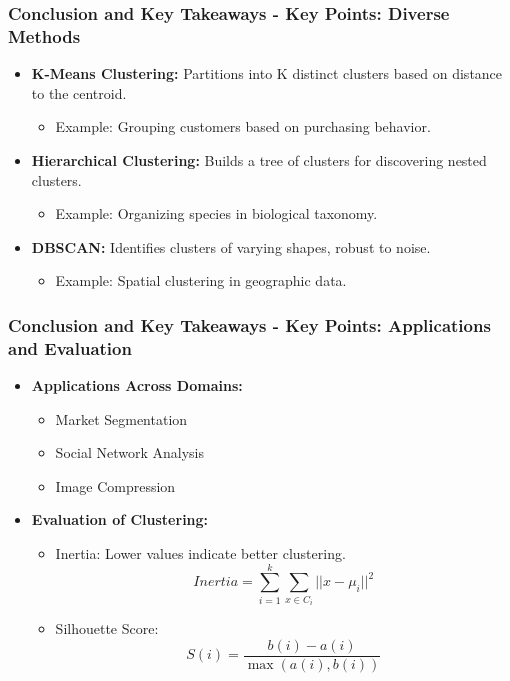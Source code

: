 \documentclass{beamer}
\begin{document}
\begin{frame}[fragile]
    \frametitle{Conclusion and Key Takeaways - Key Points: Diverse Methods}
    \begin{itemize}
        \item \textbf{K-Means Clustering:} Partitions into K distinct clusters based on distance to the centroid.
        \begin{itemize}
            \item Example: Grouping customers based on purchasing behavior.
        \end{itemize}
        
        \item \textbf{Hierarchical Clustering:} Builds a tree of clusters for discovering nested clusters.
        \begin{itemize}
            \item Example: Organizing species in biological taxonomy.
        \end{itemize}
        
        \item \textbf{DBSCAN:} Identifies clusters of varying shapes, robust to noise.
        \begin{itemize}
            \item Example: Spatial clustering in geographic data.
        \end{itemize}
    \end{itemize}
\end{frame}

\begin{frame}[fragile]
    \frametitle{Conclusion and Key Takeaways - Key Points: Applications and Evaluation}
    \begin{itemize}
        \item \textbf{Applications Across Domains:}
        \begin{itemize}
            \item Market Segmentation
            \item Social Network Analysis
            \item Image Compression
        \end{itemize}
        
        \item \textbf{Evaluation of Clustering:}
        \begin{itemize}
            \item Inertia: Lower values indicate better clustering. 
            \begin{equation}
                Inertia = \sum_{i=1}^{k} \sum_{x \in C_i} ||x - \mu_i||^2
            \end{equation}
            \item Silhouette Score: 
            \begin{equation}
                S(i) = \frac{b(i) - a(i)}{\max{(a(i), b(i))}}
            \end{equation}
        \end{itemize}
    \end{itemize}
\end{frame}
\end{document}
